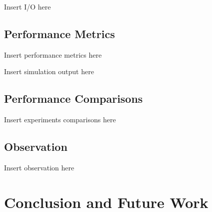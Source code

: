 \documentclass[conference]{IEEEtran}
\begin{document}
Insert I/O here


\subsection{Performance Metrics}

Insert performance metrics here


Insert simulation output here


\subsection{Performance Comparisons}

Insert experiments comparisons here


\subsection{Observation}

Insert observation here



\section{Conclusion and Future Work}
\end{document}
